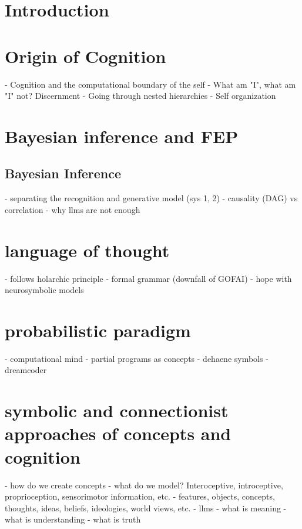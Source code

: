 \section{Introduction}

\section{Origin of Cognition}
- Cognition and the computational boundary of the self
- What am "I", what am "I" not? Discernment
- Going through nested hierarchies
- Self organization
\section{Bayesian inference and FEP}


\subsection{Bayesian Inference}
- separating the recognition and generative model (sys 1, 2)
- causality (DAG) vs correlation
- why llms are not enough

\section{language of thought}
- follows holarchic principle
- formal grammar (downfall of GOFAI)
- hope with neurosymbolic models

\section{probabilistic paradigm}
- computational mind
- partial programs as concepts
- dehaene symbols
- dreamcoder

\section{symbolic and connectionist approaches of concepts and cognition}
- how do we create concepts
- what do we model? Interoceptive, introceptive, proprioception, sensorimotor information, etc. 
- features, objects, concepts, thoughts, ideas, beliefs, ideologies, world views, etc. 
- llms
- what is meaning
- what is understanding
- what is truth







